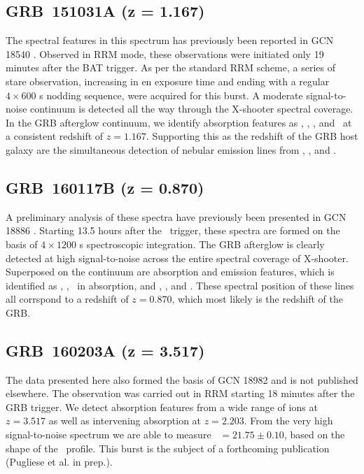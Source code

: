 \documentclass{aa}    %
\begin{document}
\subsection{GRB~151031A (z = 1.167)}\label{151031}

The spectral features in this spectrum has previously been reported in GCN 18540
\citep{GCN18540}. Observed in RRM mode, these observations were initiated only
19 minutes after the BAT trigger. As per the standard RRM scheme, a series of
stare observation, increasing in en exposure time and ending with a regular $4
\times 600$ s nodding sequence, were acquired for this burst. A moderate
signal-to-noise continuum is detected all the way through the X-shooter spectral
coverage. In the GRB afterglow continuum, we identify absorption features as
\feii, \mgii, \mgi, and \caii~at a consistent redshift of $z = 1.167$.
Supporting this as the redshift of the GRB host galaxy are the simultaneous
detection of nebular emission lines from \oii, \hb, and \oiii.

\subsection{GRB~160117B (z = 0.870)}	\label{160117}

A preliminary analysis of these spectra have previously been presented in GCN
18886 \citep{GCN18886}. Starting 13.5 hours after the \swift~trigger, these
spectra are formed on the basis of $4 \times 1200$ s spectroscopic integration.
The GRB afterglow is clearly detected at high signal-to-noise across the entire
spectral coverage of X-shooter. Superposed on the continuum are absorption and
emission features, which is identified as \feii, \mgii, \mgi~in absorption, and
\oii, \hb, and \oiii. These spectral position of these lines all corrspond to a
redshift of $z = 0.870$, which most likely is the redshift of the GRB.

\subsection{GRB~160203A (z = 3.517)}\label{160203}

The data presented here also formed the basis of GCN 18982 \citep{GCN18982} and
is not published elsewhere. The observation was carried out in RRM starting 18
minutes after the GRB trigger. We detect absorption features from a wide range
of ions at $z=3.517$ as well as intervening absorption at $z=2.203$. From the
very high signal-to-noise spectrum we are able to measure \nh~$=21.75 \pm 0.10$,
based on the shape of the \lya~profile. This burst is the subject of a
forthcoming publication (Pugliese et al. in prep.).
\end{document}
